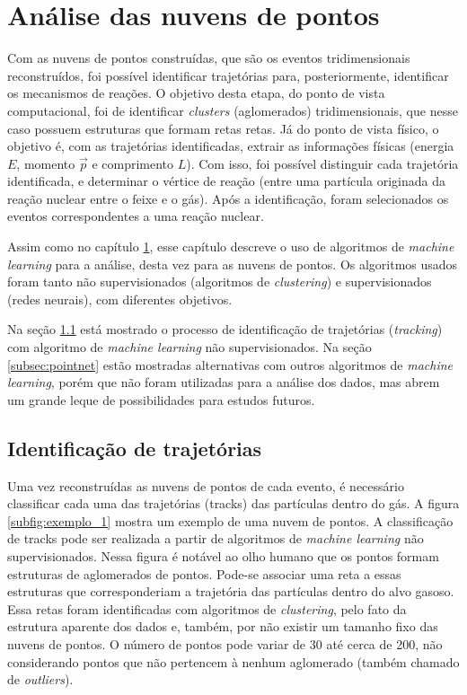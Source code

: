 \documentclass[a4paper,12pt,oneside]{book}
\begin{document}
\chapter{Análise das nuvens de pontos}\label{chapter:point_cloud_analysis}

\par Com as nuvens de pontos construídas, que são os eventos tridimensionais reconstruídos, foi possível identificar trajetórias para, posteriormente, identificar os mecanismos de reações. O objetivo desta etapa, do ponto de vista computacional, foi de identificar \textit{clusters} (aglomerados) tridimensionais, que nesse caso possuem estruturas que formam retas retas. Já do ponto de vista físico, o objetivo é, com as trajetórias identificadas, extrair as informações físicas (energia $E$, momento $\vec{p}$ e comprimento $L$). Com isso, foi possível distinguir cada trajetória identificada, e determinar o vértice de reação (entre uma partícula originada da reação nuclear entre o feixe e o gás). Após a identificação, foram selecionados os eventos correspondentes a uma reação nuclear.

\par Assim como no capítulo \ref{chapter:point_cloud_analysis}, esse capítulo descreve o uso de algoritmos de \textit{machine learning} para a análise, desta vez para as nuvens de pontos. Os algoritmos usados foram tanto não supervisionados (algoritmos de \textit{clustering}) e supervisionados (redes neurais), com diferentes objetivos.

\par Na seção \ref{sec:forcabruta} está mostrado o processo de identificação de trajetórias (\textit{tracking}) com algoritmo de \textit{machine learning} não supervisionados. Na seção \ref{subsec:pointnet} estão mostradas alternativas com outros algoritmos de \textit{machine learning}, porém que não foram utilizadas para a análise dos dados, mas abrem um grande leque de possibilidades para estudos futuros.



\section{Identificação de trajetórias}\label{sec:forcabruta}

\par Uma vez reconstruídas as nuvens de pontos de cada evento, é necessário classificar cada uma das trajetórias (tracks) das partículas dentro do gás. A figura \ref{subfig:exemplo_1} mostra um exemplo de uma nuvem de pontos. A classificação de tracks pode ser realizada a partir de algoritmos de \textit{machine learning} não supervisionados. Nessa figura é notável ao olho humano que os pontos formam estruturas de aglomerados de pontos. Pode-se associar uma reta a essas estruturas que corresponderiam a trajetória das partículas dentro do alvo gasoso. Essa retas foram identificadas com algoritmos de \textit{clustering}, pelo fato da estrutura aparente dos dados e, também, por não existir um tamanho fixo das nuvens de pontos. O número de pontos pode variar de 30 até cerca de 200, não considerando pontos que não pertencem à nenhum aglomerado (também chamado de \textit{outliers}).
\end{document}
